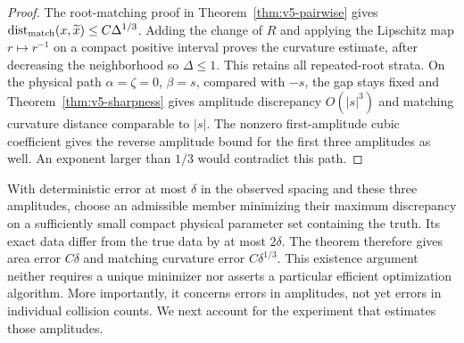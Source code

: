 \begin{proof}
The root-matching proof in Theorem~\ref{thm:v5-pairwise} gives
$\operatorname{dist}_{\rm match}(x,\widetilde x)
\le C\Delta^{1/3}$. Adding the change of $R$ and applying the
Lipschitz map $r\mapsto r^{-1}$ on a compact positive interval proves
the curvature estimate, after decreasing the neighborhood so
$\Delta\le1$. This retains all repeated-root strata. On the physical
path $\alpha=\zeta=0$, $\beta=s$, compared with $-s$, the gap stays
fixed and Theorem~\ref{thm:v5-sharpness} gives amplitude discrepancy
$O(|s|^3)$ and matching curvature distance comparable to $|s|$.
The nonzero first-amplitude cubic coefficient gives the reverse
amplitude bound for the first three amplitudes as well. An exponent
larger than $1/3$ would contradict this path.
\end{proof}

With deterministic error at most $\delta$ in the observed spacing and
these three amplitudes, choose an admissible member minimizing their
maximum discrepancy on a sufficiently small compact physical parameter
set containing the truth. Its exact data differ from the true data by
at most $2\delta$. The theorem therefore gives area error $C\delta$
and matching curvature error $C\delta^{1/3}$. This existence argument
neither requires a unique minimizer nor asserts a particular efficient
optimization algorithm. More importantly, it concerns errors in
amplitudes, not yet errors in individual collision counts. We next
account for the experiment that estimates those amplitudes.
